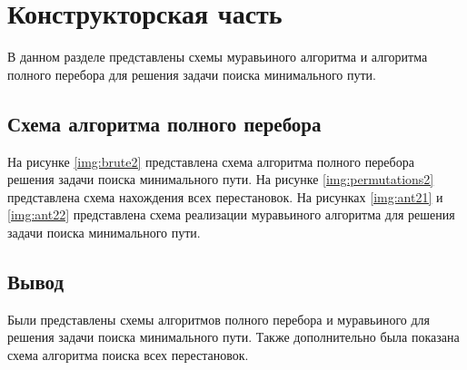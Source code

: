 \chapter{Конструкторская часть}

В данном разделе представлены схемы муравьиного алгоритма и алгоритма полного перебора для решения задачи поиска минимального пути.

\section{Схема алгоритма полного перебора}

На рисунке \ref{img:brute2} представлена схема алгоритма полного перебора решения задачи поиска минимального пути. На рисунке \ref{img:permutations2} представлена схема нахождения всех перестановок. На рисунках \ref{img:ant21} и \ref{img:ant22} представлена схема реализации муравьиного алгоритма для решения задачи поиска минимального пути.

\clearpage
{}
\clearpage
{}
\clearpage
{}
\clearpage
{}
\clearpage

\section*{Вывод}
Были представлены схемы алгоритмов полного перебора и муравьиного для решения задачи поиска минимального пути. Также дополнительно была показана схема алгоритма поиска всех перестановок.

